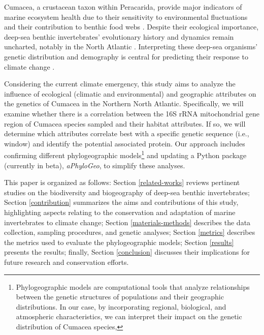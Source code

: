 Cumacea, a crustacean taxon within Peracarida, provide major indicators of marine ecosystem health due to their sensitivity to environmental fluctuations \citep{stransky_diversity_2010} and their contribution to benthic food webs \citep{rehm2009cumacea}. Despite their ecological importance, deep-sea benthic invertebrates’ evolutionary history and dynamics remain uncharted, notably in the North Atlantic \citep{jennings_phylogeographic_2014}. Interpreting these deep-sea organisms' genetic distribution and demography is central for predicting their response to climate change \citep{jennings_phylogeographic_2014}. 

Considering the current climate emergency, this study aims to analyze the influence of ecological (climatic and environmental) and geographic attributes on the genetics of Cumacea in the Northern North Atlantic. Specifically, we will examine whether there is a correlation between the 16S rRNA mitochondrial gene region of Cumacea species sampled and their habitat attributes. If so, we will determine which attributes correlate best with a specific genetic sequence (i.e., window) and identify the potential associated protein. Our approach includes confirming different {phylogeographic models}\footnote{Phylogeographic models are computational tools that analyze relationships between the genetic structures of populations and their geographic distributions. In our case, by incorporating regional, biological, and atmospheric characteristics, we can interpret their impact on the genetic distribution of Cumacea species,} and updating a Python package (currently in beta), \textit{aPhyloGeo}, to simplify these analyses.

This paper is organized as follows: Section \autoref{related-works} reviews pertinent studies on the biodiversity and biogeography of deep-sea benthic invertebrates; Section \autoref{contribution} summarizes the aims and contributions of this study, highlighting aspects relating to the conservation and adaptation of marine invertebrates to climate change; Section \autoref{materials-methods} describes the data collection, sampling procedures, and genetic analyses; Section \autoref{metrics} describes the metrics used to evaluate the phylogeographic models; Section \autoref{results} presents the results; finally, Section \autoref{conclusion} discusses their implications for future research and conservation efforts.

